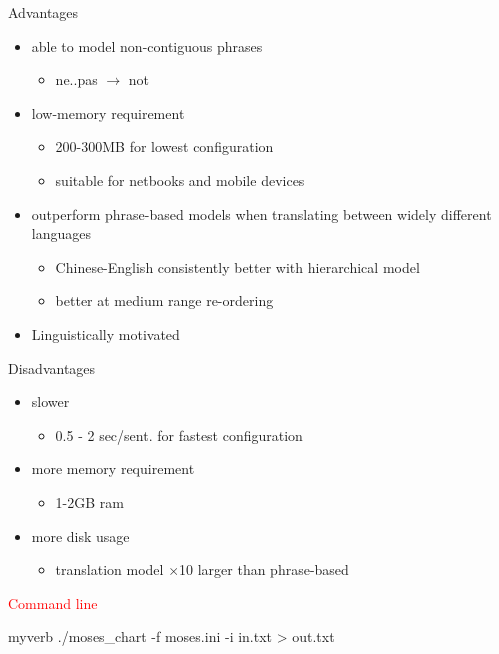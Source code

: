 \documentclass[landscape]{uedslides2C}
\begin{document}
{\small \begin{multicols}{2}

Advantages
\begin{itemize}
\item able to model non-contiguous phrases
	\begin{itemize}
	\item ne..pas $\rightarrow$ not
	\end{itemize}
\item low-memory requirement
	\begin{itemize}
	\item 200-300MB for lowest configuration
	\item suitable for netbooks and mobile devices
	\end{itemize}
\item outperform phrase-based models when translating between widely different languages
	\begin{itemize}
	\item Chinese-English consistently better with hierarchical model 
	\item better at medium range re-ordering
	\end{itemize}
\item Linguistically motivated 
\end{itemize}

\columnbreak

Disadvantages
\begin{itemize}
\item slower
	\begin{itemize}
	\item 0.5 - 2 sec/sent. for fastest configuration
	\end{itemize}
\item more memory requirement
	\begin{itemize}
	\item 1-2GB ram
	\end{itemize}
\item more disk usage
	\begin{itemize}
	\item translation model $\times$10 larger than phrase-based
	\end{itemize}
\end{itemize}

\end{multicols}
}
\begin{center}
\textcolor{red}{Command line} 
\begin{SaveVerbatim}{myverb}
./moses_chart -f moses.ini -i in.txt > out.txt
\end{SaveVerbatim}
\colorbox{gray}{}
\end{center}
\end{document}
